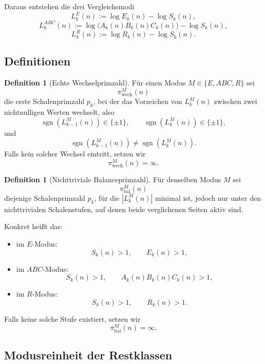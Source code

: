 \documentclass[11pt,a4paper]{article}
\theoremstyle{definition}
\newtheorem{definition}[satz]{Definition}
\theoremstyle{remark}
\begin{document}
	Daraus entstehen die drei Vergleichsmodi
	\[
	L_k^{E}(n):=\log E_k(n)-\log S_k(n),
	\]
	\[
	L_k^{ABC}(n):=\log\!\bigl(A_k(n)B_k(n)C_k(n)\bigr)-\log S_k(n),
	\]
	\[
	L_k^{R}(n):=\log R_k(n)-\log S_k(n).
	\]
	
	\subsection{Definitionen}
	
	\begin{definition}[Echte Wechselprimzahl]
		Für einen Modus \(M\in\{E,ABC,R\}\) sei
		\[
		\pi_{\mathrm{wech}}^{M}(n)
		\]
		die erste Schalenprimzahl \(p_k\), bei der das Vorzeichen von \(L_k^{M}(n)\)
		zwischen zwei nichtnulligen Werten wechselt, also
		\[
		\operatorname{sgn}(L_{k-1}^{M}(n))\in\{\pm1\},\qquad
		\operatorname{sgn}(L_k^{M}(n))\in\{\pm1\},
		\]
		und
		\[
		\operatorname{sgn}(L_{k-1}^{M}(n))\neq \operatorname{sgn}(L_k^{M}(n)).
		\]
		Falls kein solcher Wechsel eintritt, setzen wir
		\[
		\pi_{\mathrm{wech}}^{M}(n)=\infty.
		\]
	\end{definition}
	
	\begin{definition}[Nichttriviale Balanceprimzahl]
		Für denselben Modus \(M\) sei
		\[
		\pi_{\mathrm{bal}}^{M}(n)
		\]
		diejenige Schalenprimzahl \(p_k\), für die \(|L_k^{M}(n)|\) minimal ist,
		jedoch nur unter den nichttrivialen Schalenstufen, auf denen beide verglichenen
		Seiten aktiv sind.
		
		Konkret heißt das:
		\begin{itemize}
			\item im \(E\)-Modus:
			\[
			S_k(n)>1,\qquad E_k(n)>1,
			\]
			\item im \(ABC\)-Modus:
			\[
			S_k(n)>1,\qquad A_k(n)B_k(n)C_k(n)>1,
			\]
			\item im \(R\)-Modus:
			\[
			S_k(n)>1,\qquad R_k(n)>1.
			\]
		\end{itemize}
		
		Falls keine solche Stufe existiert, setzen wir
		\[
		\pi_{\mathrm{bal}}^{M}(n)=\infty.
		\]
	\end{definition}
	
	\subsection{Modusreinheit der Restklassen}
	
\end{document}
